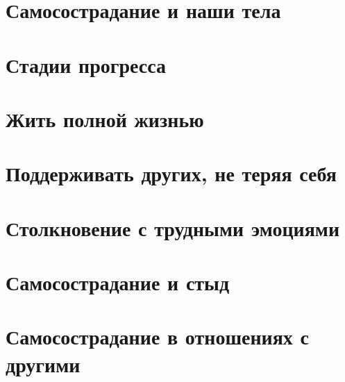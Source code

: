 \documentclass[a4paper,12pt]{report}
\begin{document}



\tableofcontents
















\chapter{Самосострадание и наши тела}
\chapter{Стадии прогресса}
\chapter{Жить полной жизнью}
\chapter{Поддерживать других, не теряя себя}
\chapter{Столкновение с трудными эмоциями}
\chapter{Самосострадание и стыд}
\chapter{Самосострадание в отношениях с другими}
\end{document}
